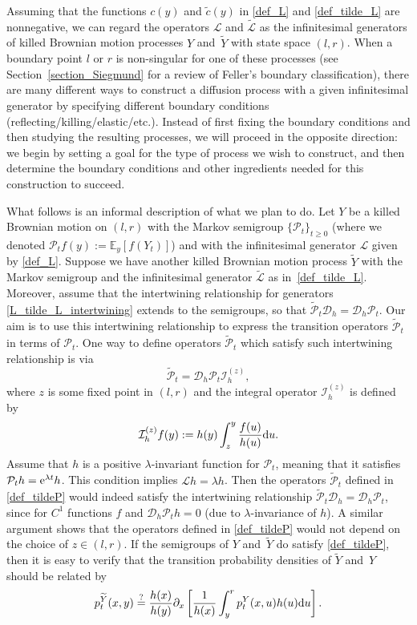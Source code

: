 \documentclass[10pt,a4paper]{amsart}
\numberwithin{equation}{section}
\theoremstyle{definition}
\def\L{{\mathcal L}}
\def\P{{\mathcal P}}
\def\D{{\mathcal D}}
\def\e{{\mathbb E}}
\def\d{{\textnormal d}}
\begin{document}
Assuming that the functions $c(y)$ and $\tilde c(y)$ in \eqref{def_L} and \eqref{def_tilde_L} are nonnegative, we can regard the operators $\L$ and $\widetilde \L$ as the infinitesimal generators of killed Brownian motion processes $Y$ and~$\widetilde Y$ with state space $(l,r)$. When a boundary point $l$ or $r$ is non-singular for one of these processes (see Section~\ref{section_Siegmund} for a review of Feller's boundary classification), there are many different ways to construct a diffusion process with a given infinitesimal generator by specifying different boundary conditions (reflecting/killing/elastic/etc.). Instead of first fixing the boundary conditions and then studying the resulting processes, we will proceed in the opposite direction: we begin by setting a goal for the type of process we wish to construct, and then determine the boundary conditions and other ingredients needed for this construction to succeed.

What follows is an informal description of what we plan to do. Let $Y$ be a killed Brownian motion on $(l,r)$ with the Markov semigroup $\{\P_t\}_{t\ge 0}$ (where we denoted $\P_t f(y):=\e_y [f(Y_t)]$) and
with the infinitesimal generator $\L$ given by \eqref{def_L}. Suppose we have another killed Brownian motion process
$\widetilde Y$ with the Markov semigroup \smash{$\big\{\widetilde \P_t\big\}_{t\ge 0}$}
and the infinitesimal generator $\widetilde \L$ as in~\eqref{def_tilde_L}. Moreover, assume that the intertwining relationship for generators \eqref{L_tilde_L_intertwining} extends to the semigroups, so that $\widetilde \P_t \D_h = \D_h \P_t$. Our aim is to use this intertwining relationship to express the transition operators $\widetilde \P_t$ in terms of $\P_t$. One way to define operators $\widetilde \P_t$ which satisfy such intertwining relationship is via
\begin{equation}\label{def_tildeP}
 \widetilde \P_t=\D_h \P_t {\mathcal I}^{(z)}_{h},
\end{equation}
where $z$ is some fixed point in $(l,r)$ and the integral operator ${\mathcal I}^{(z)}_{h}$ is defined by
\[
{\mathcal I}^{(z)}_{h} f(y):=h(y) \int_z^y \frac{f(u)}{h(u)} \d u.
\]
 Assume that $h$ is a positive $\lambda$-invariant function for $\P_t$, meaning that it satisfies $\P_t h={\rm e}^{\lambda t} h$. This condition implies $\L h=\lambda h$. Then the operators $\widetilde \P_t$ defined in \eqref{def_tildeP} would indeed satisfy the intertwining relationship $\widetilde \P_t \D_h = \D_h \P_t$, since \smash{${\mathcal I}^{(z)}_{h} \D_h f(y)=f(y)-f(z)h(y)/h(z)$} for $C^1$ functions $f$ and $\D_h \P_t h=0$ (due to $\lambda$-invariance of $h$). A similar argument shows that the operators defined in \eqref{def_tildeP} would not depend on the choice of $z \in (l,r)$. If the semigroups
of $Y$ and~$\widetilde Y$ do satisfy \eqref{def_tildeP}, then it is easy to verify that the transition probability densities of $\widetilde Y$ and~$Y$ should be related by
\begin{equation}\label{equation_tilde_p0}
 p_t^{\widetilde Y}(x,y) \stackrel{?}{=}\frac{h(x)}{h(y)} \partial_{x}
\left[ \frac{1}{h(x)} \int_{y}^r p_t^Y(x,u) h(u) \d u \right].
\end{equation}
\end{document}
